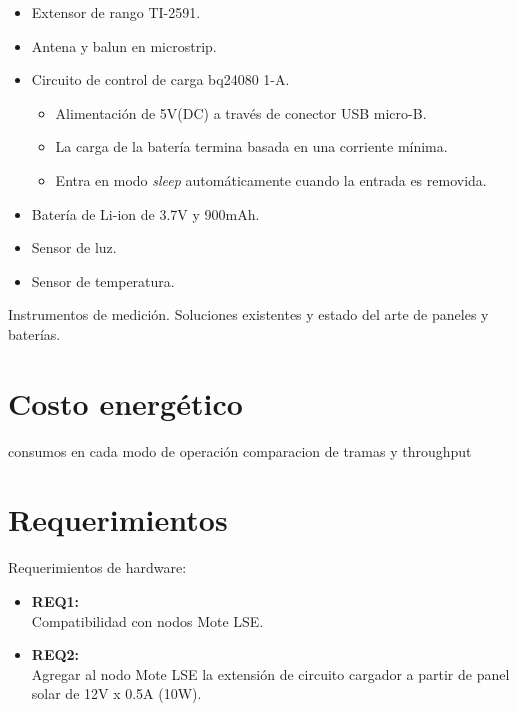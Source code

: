 \begin{itemize}
\item Extensor de rango TI-2591.
\item Antena y balun en microstrip.
\item Circuito de control de carga bq24080 1-A.
		\begin{itemize}
			\item Alimentación de 5V(DC) a través de conector USB micro-B.
			\item La carga de la batería termina basada en una corriente mínima.
			\item Entra en modo \textit{sleep} automáticamente cuando la entrada es removida.		
		\end{itemize}
\item Batería de Li-ion de 3.7V y 900mAh.
\item Sensor de luz.
\item Sensor de temperatura.
\end{itemize}

Instrumentos de medición. Soluciones existentes y estado del arte de paneles y baterías.


\section{Costo energético}
\label{sec:costo}
consumos en cada modo de operación
comparacion de tramas y throughput


\clearpage
\section{Requerimientos}
\label{sec:requerimientos}

\noindent Requerimientos de hardware:
\begin{itemize}
	\item \textbf{REQ1:}\\ Compatibilidad con nodos Mote LSE.
	\item \textbf{REQ2:}\\ Agregar al nodo Mote LSE la extensión de circuito cargador a partir de panel solar de 12V x 0.5A (10W).
\end{itemize}
	
